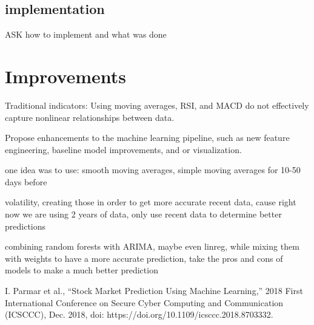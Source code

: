 \documentclass[conference]{IEEEtran}
\begin{document}
\subsection{implementation}
ASK how to implement and what was done

\section{Improvements}
Traditional indicators: Using moving averages, RSI, and MACD do not effectively capture nonlinear relationships between data.

Propose enhancements to the machine learning pipeline, such as new feature engineering, baseline model improvements, and or visualization.

one idea was to use:  smooth moving averages, simple moving averages for 10-50 days before

volatility, creating those in order to get more accurate recent data, cause right now we are using 2 years of data, only use recent data to determine better predictions

combining random forests with ARIMA, maybe even linreg, while mixing them with weights to have a more accurate prediction, take the pros and cons of models to make a much better prediction


\begin{thebibliography}{00}
I. Parmar et al., “Stock Market Prediction Using Machine Learning,” 2018 First International Conference on Secure Cyber Computing and Communication (ICSCCC), Dec. 2018, doi: https://doi.org/10.1109/icsccc.2018.8703332.
‌
\end{thebibliography}
\vspace{12pt}
\end{document}
